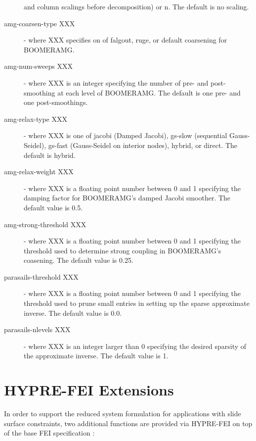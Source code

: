 \begin{description}
                       and column scalings before decomposition) or {\sf n}.
                       The default is no scaling.
\item[amg-coarsen-type XXX] - where XXX specifies on of {\sf falgout},
                       {\sf ruge}, or {\sf default} coarsening for BOOMERAMG.
\item[amg-num-sweeps XXX] - where XXX is an integer specifying the number of
                       pre- and post-smoothing at each level of BOOMERAMG.
                       The default is one pre- and one post-smoothings.
\item[amg-relax-type XXX] - where XXX is one of {\sf jacobi} (Damped Jacobi),
                       {\sf gs-slow} (sequential Gauss-Seidel), {\sf gs-fast}
                       (Gauss-Seidel on interior nodes), {\sf hybrid},
                       or {\sf direct}. The default is {\sf hybrid}.
\item[amg-relax-weight XXX] - where XXX is a floating point number between 0 and 1
                       specifying the damping factor for BOOMERAMG's damped
                       Jacobi smoother.  The default value is 0.5.
\item[amg-strong-threshold XXX] - where XXX is a floating point number between 0 
                       and 1 specifying the threshold used to determine
                       strong coupling in BOOMERAMG's coasening.  The default 
                       value is 0.25.
\item[parasails-threshold XXX] - where XXX is a floating point number between 0 
                       and 1 specifying the threshold used to prune small entries
                       in setting up the sparse approximate inverse.  The default
                       value is 0.0.
\item[parasails-nlevels XXX] - where XXX is an integer larger than 0 specifying 
                       the desired sparsity of the approximate inverse.  The
                       default value is 1.
\end{description}


\section{HYPRE-FEI Extensions}

In order to support the reduced system formulation for applications
with slide surface constraints,
two additional functions are provided via HYPRE-FEI
on top of the base FEI specification :

